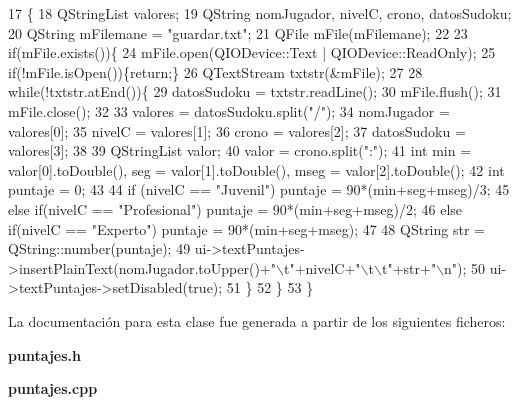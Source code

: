 \begin{DoxyCode}
17                           \{
18     QStringList  valores;
19     QString nomJugador, nivelC, crono, datosSudoku;
20     QString mFilemane = \textcolor{stringliteral}{"guardar.txt"};
21     QFile mFile(mFilemane);
22 
23     \textcolor{keywordflow}{if}(mFile.exists())\{
24         mFile.open(QIODevice::Text | QIODevice::ReadOnly);
25         \textcolor{keywordflow}{if}(!mFile.isOpen())\{\textcolor{keywordflow}{return};\}
26         QTextStream txtstr(&mFile);
27 
28         \textcolor{keywordflow}{while}(!txtstr.atEnd())\{
29             datosSudoku = txtstr.readLine();
30             mFile.flush();
31             mFile.close();
32 
33             valores = datosSudoku.split(\textcolor{stringliteral}{"/"});
34             nomJugador = valores[0];
35             nivelC = valores[1];
36             crono = valores[2];
37             datosSudoku = valores[3];
38 
39             QStringList valor;
40             valor = crono.split(\textcolor{stringliteral}{":"});
41             \textcolor{keywordtype}{int} min = valor[0].toDouble(), seg = valor[1].toDouble(), mseg = valor[2].toDouble();
42             \textcolor{keywordtype}{int} puntaje = 0;
43 
44             \textcolor{keywordflow}{if} (nivelC == \textcolor{stringliteral}{"Juvenil"})                puntaje = 90*(min+seg+mseg)/3;
45             \textcolor{keywordflow}{else} \textcolor{keywordflow}{if}(nivelC == \textcolor{stringliteral}{"Profesional"})        puntaje = 90*(min+seg+mseg)/2;
46             \textcolor{keywordflow}{else} \textcolor{keywordflow}{if}(nivelC == \textcolor{stringliteral}{"Experto"})            puntaje = 90*(min+seg+mseg);
47 
48             QString str = QString::number(puntaje);
49             ui->textPuntajes->insertPlainText(nomJugador.toUpper()+\textcolor{stringliteral}{"\(\backslash\)t"}+nivelC+\textcolor{stringliteral}{"\(\backslash\)t\(\backslash\)t"}+str+\textcolor{stringliteral}{"\(\backslash\)n"});
50             ui->textPuntajes->setDisabled(\textcolor{keyword}{true});
51         \}
52     \}
53 \}
\end{DoxyCode}


La documentación para esta clase fue generada a partir de los siguientes ficheros\-:\begin{DoxyCompactItemize}
\item 
{\bf puntajes.\-h}\item 
{\bf puntajes.\-cpp}\end{DoxyCompactItemize}
